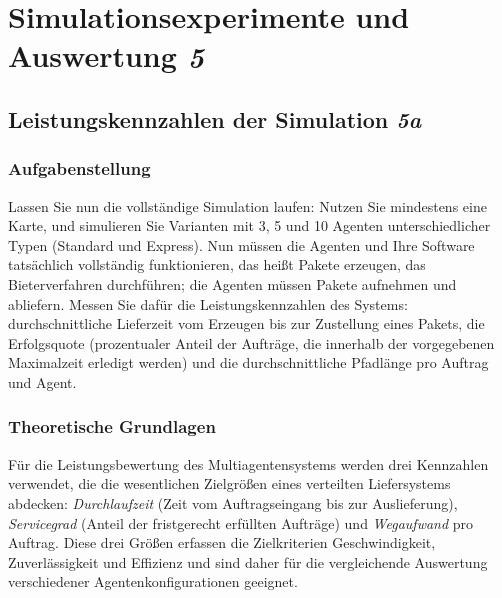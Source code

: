 
\chapter{Simulationsexperimente und Auswertung \textit{5}}
\label{chap:aufgabe5}
\thispagestyle{fancy}


\section{Leistungskennzahlen der Simulation \textit{5a}}
\label{sec:aufgabe5a}

\subsection{Aufgabenstellung}

Lassen Sie nun die vollständige Simulation laufen: Nutzen Sie mindestens eine Karte, und simulieren Sie Varianten mit 3, 5 und 10 Agenten unterschiedlicher Typen (Standard und Express). Nun müssen die Agenten und Ihre Software tatsächlich vollständig funktionieren, das heißt Pakete erzeugen, das Bieterverfahren durchführen; die Agenten müssen Pakete aufnehmen und abliefern. Messen Sie dafür die Leistungskennzahlen des Systems: durchschnittliche Lieferzeit vom Erzeugen bis zur Zustellung eines Pakets, die Erfolgsquote (prozentualer Anteil der Aufträge, die innerhalb der vorgegebenen Maximalzeit erledigt werden) und die durchschnittliche Pfadlänge pro Auftrag und Agent.

\subsection{Theoretische Grundlagen}

Für die Leistungsbewertung des Multiagentensystems werden drei Kennzahlen verwendet, die die wesentlichen Zielgrößen eines verteilten Liefersystems abdecken: \textit{Durchlaufzeit} (Zeit vom Auftragseingang bis zur Auslieferung), \textit{Servicegrad} (Anteil der fristgerecht erfüllten Aufträge) und \textit{Wegaufwand} pro Auftrag. Diese drei Größen erfassen die Zielkriterien Geschwindigkeit, Zuverlässigkeit und Effizienz und sind daher für die vergleichende Auswertung verschiedener Agentenkonfigurationen geeignet.

